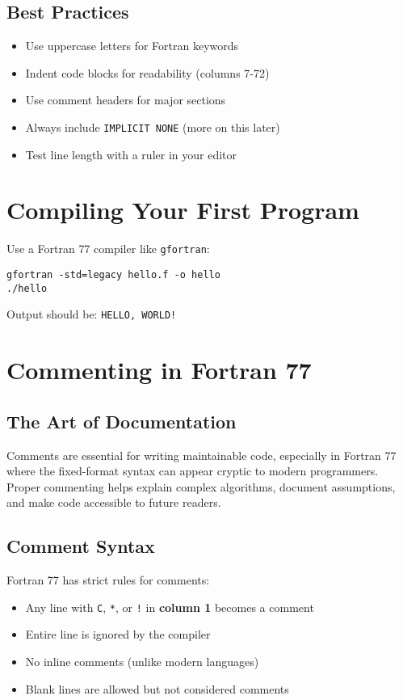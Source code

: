 \documentclass{book}
\begin{document}
\subsection*{Best Practices}
\begin{itemize}
    \item Use uppercase letters for Fortran keywords
    \item Indent code blocks for readability (columns 7-72)
    \item Use comment headers for major sections
    \item Always include \texttt{IMPLICIT NONE} (more on this later)
    \item Test line length with a ruler in your editor
\end{itemize}

\section*{Compiling Your First Program}
Use a Fortran 77 compiler like \texttt{gfortran}:
\begin{verbatim}
gfortran -std=legacy hello.f -o hello
./hello
\end{verbatim}
Output should be: \texttt{HELLO, WORLD!}

\section{Commenting in Fortran 77}

\subsection*{The Art of Documentation}
Comments are essential for writing maintainable code, especially in Fortran 77 where the fixed-format syntax can appear cryptic to modern programmers. Proper commenting helps explain complex algorithms, document assumptions, and make code accessible to future readers.

\subsection*{Comment Syntax}
Fortran 77 has strict rules for comments:
\begin{itemize}
    \item Any line with \texttt{C}, \texttt{*}, or \texttt{!} in \textbf{column 1} becomes a comment
    \item Entire line is ignored by the compiler
    \item No inline comments (unlike modern languages)
    \item Blank lines are allowed but not considered comments
\end{itemize}
\end{document}
